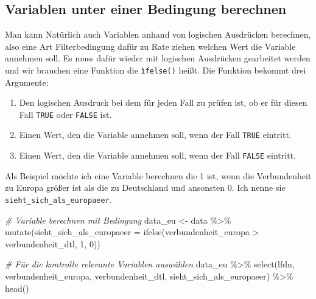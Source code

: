 \documentclass[
]{book}
\newenvironment{Shaded}{\begin{snugshade}}{\end{snugshade}}
\newcommand{\AttributeTok}[1]{\textcolor[rgb]{0.77,0.63,0.00}{#1}}
\newcommand{\CommentTok}[1]{\textcolor[rgb]{0.56,0.35,0.01}{\textit{#1}}}
\newcommand{\DecValTok}[1]{\textcolor[rgb]{0.00,0.00,0.81}{#1}}
\newcommand{\FunctionTok}[1]{\textcolor[rgb]{0.00,0.00,0.00}{#1}}
\newcommand{\NormalTok}[1]{#1}
\newcommand{\OtherTok}[1]{\textcolor[rgb]{0.56,0.35,0.01}{#1}}
\newcommand{\SpecialCharTok}[1]{\textcolor[rgb]{0.00,0.00,0.00}{#1}}
\begin{document}
\hypertarget{variablen-unter-einer-bedingung-berechnen}{%
\subsection{Variablen unter einer Bedingung berechnen}\label{variablen-unter-einer-bedingung-berechnen}}

Man kann Natürlich auch Variablen anhand von logischen Ausdrücken berechnen, also eine Art Filterbedingung dafür zu Rate ziehen welchen Wert die Variable annehmen soll. Es muss dafür wieder mit logischen Ausdrücken gearbeitet werden und wir brauchen eine Funktion die \texttt{ìfelse()} heißt. Die Funktion bekommt drei Argumente:

\begin{enumerate}
\def\labelenumi{\arabic{enumi}.}
\item
  Den logischen Ausdruck bei dem für jeden Fall zu prüfen ist, ob er für diesen Fall \texttt{TRUE} oder \texttt{FALSE} ist.
\item
  Einen Wert, den die Variable annehmen soll, wenn der Fall \texttt{TRUE} eintritt.
\item
  Einen Wert, den die Variable annehmen soll, wenn der Fall \texttt{FALSE} eintritt.
\end{enumerate}

Als Beispiel möchte ich eine Variable berechnen die 1 ist, wenn die Verbundenheit zu Europa größer ist als die zu Deutschland und ansonsten 0. Ich nenne sie \texttt{sieht\_sich\_als\_europaeer}.

\begin{Shaded}
\begin{Highlighting}[]
\CommentTok{\# Variable berechnen mit Bedingung}
\NormalTok{data\_eu }\OtherTok{\textless{}{-}}\NormalTok{ data }\SpecialCharTok{\%\textgreater{}\%} 
  \FunctionTok{mutate}\NormalTok{(}\AttributeTok{sieht\_sich\_als\_europaeer =} \FunctionTok{ifelse}\NormalTok{(verbundenheit\_europa }\SpecialCharTok{\textgreater{}}\NormalTok{ verbundenheit\_dtl, }\DecValTok{1}\NormalTok{, }\DecValTok{0}\NormalTok{)) }

\CommentTok{\# Für die kontrolle relevante Variablen auswählen}
\NormalTok{data\_eu }\SpecialCharTok{\%\textgreater{}\%} 
  \FunctionTok{select}\NormalTok{(lfdn, verbundenheit\_europa, verbundenheit\_dtl, sieht\_sich\_als\_europaeer) }\SpecialCharTok{\%\textgreater{}\%}   \FunctionTok{head}\NormalTok{()}
\end{Highlighting}
\end{Shaded}
\end{document}

